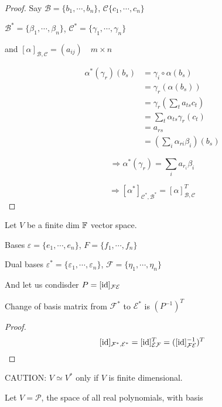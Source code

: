 \documentclass[a4paper]{article}
\begin{document}
\begin{proof}
	 Say $ \mathcal{B} = \{ b_{1},\cdots,b_{n} \} $, $ \mathcal{C} \{ c_{1},\cdots,c_{n} \} $
	 
	 $ \mathcal{B}^{*} = \{  \beta_{1},\cdots,\beta_{n} \} $, $ \mathcal{C}^{*} = \{  \gamma_{1},\cdots,\gamma_{n} \} $
	 
	 and $ [\alpha]_{\mathcal{B},\mathcal{C}} = (a_{ij}) \quad m \times n $


\begin{align*}
\alpha^{*}(\gamma_{r}) (b_{s}) & = \gamma_{i} \circ \alpha(b_{s}) \\
& = \gamma_{r} (\alpha(b_{s})) \\
& = \gamma_{r} \left( \sum_{t} a_{ts}c_{t} \right) \\
& = \sum_{t} \alpha_{ts}\gamma_{r}(c_{t}) \\
& = a_{rs} \\
& = \left(  \sum_{i} \alpha_{ri} \beta_{i} \right)(b_{s})
\end{align*}

\[ \Rightarrow \alpha^{*}(\gamma_{r}) = \sum_{i} a_{r_{i}} \beta_{i} \]

\[ \Rightarrow [\alpha^{*}]_{\mathcal{C}^{*},\mathcal{B}^{*}} = [\alpha]_{\mathcal{B},\mathcal{C}}^{T} \]

\end{proof}


Let $ V $ be a finite dim $ \mathbb{F} $ vector space.

Bases $ \varepsilon = \{   e_{1},\cdots,e_{n} \} $, $ F = \{ f_{1},\cdots,f_{n} \} $

Dual bases $ \varepsilon^{*} = \{  \varepsilon_{1},\cdots,\varepsilon_{n} \} $, $ \mathcal{F} = \{ \eta_{1},\cdots,\eta_{n} \} $

And let us condisder $ P = [\operatorname{id}]_{\mathcal{F}\mathcal{E}} $

\begin{lemma} 
	Change of basis matrix from $ \mathcal{F}^{*} $ to $ \mathcal{E}^{*} $ is $ (P^{-1})^{T} $
\end{lemma}

\begin{proof}
	\[ [\operatorname{id}]_{\mathcal{F}^{*},\mathcal{E}^{*}} = [\operatorname{id}]_{\mathcal{E}\mathcal{F}}^{T} = ([\operatorname{id}]_{\mathcal{F}\mathcal{E}}^{-1})^{T}  \]
\end{proof}

CAUTION: $ V \simeq V^{*} $ only if $ V $ is finite dimensional.

Let $ V = \mathcal{P} $, the space of all real polynomials, with basis
\end{document}
